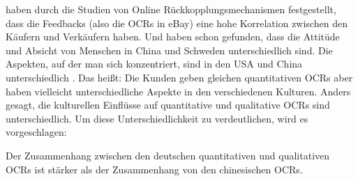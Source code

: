 \citeauthor{resnick2002trust} haben durch die Studien von Online Rückkopplungsmechanismen festgestellt, dass die Feedbacks (also die \ac{OCRs} in eBay) eine hohe Korrelation zwischen den Käufern und Verkäufern haben. Und \citeauthor{Stenberg2014} haben schon gefunden, dass die Attitüde und Absicht von Menschen in China und Schweden unterschiedlich sind. Die Aspekten, auf der man sich konzentriert, sind in den USA und China unterschiedlich \citep{lu2015understanding}. Das heißt: Die Kunden geben gleichen quantitativen \ac{OCRs} aber  haben vielleicht unterschiedliche Aspekte in den verschiedenen Kulturen. Anders gesagt, die kulturellen Einflüsse auf quantitative und qualitative \ac{OCRs} sind unterschiedlich. Um diese Unterschiedlichkeit zu verdeutlichen, wird es vorgeschlagen:
\begin{hyp} 
Der Zusammenhang zwischen den deutschen quantitativen und qualitativen \acl{OCRs} ist stärker als der Zusammenhang von den chinesischen \acl{OCRs}.
\label{hyp:4}
\end{hyp}
